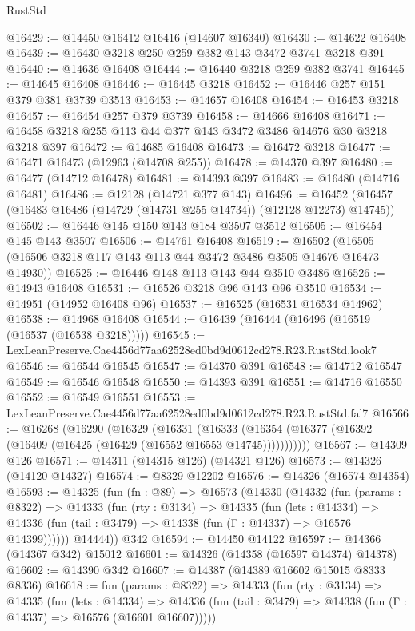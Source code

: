 \begin{lexlean}{RustStd}
\begin{coremodule}
@16429 := @14450 @16412 @16416 (@14607 @16340)
@16430 := @14622 @16408
@16439 := @16430 @3218 @250 @259 @382 @143 @3472 @3741 @3218 @391
@16440 := @14636 @16408
@16444 := @16440 @3218 @259 @382 @3741
@16445 := @14645 @16408
@16446 := @16445 @3218
@16452 := @16446 @257 @151 @379 @381 @3739 @3513
@16453 := @14657 @16408
@16454 := @16453 @3218
@16457 := @16454 @257 @379 @3739
@16458 := @14666 @16408
@16471 := @16458 @3218 @255 @113 @44 @377 @143 @3472 @3486 @14676 @30 @3218 @3218 @397
@16472 := @14685 @16408
@16473 := @16472 @3218
@16477 := @16471 @16473 (@12963 (@14708 @255))
@16478 := @14370 @397
@16480 := @16477 (@14712 @16478)
@16481 := @14393 @397
@16483 := @16480 (@14716 @16481)
@16486 := @12128 (@14721 @377 @143)
@16496 := @16452 (@16457 (@16483 @16486 (@14729 (@14731 @255 @14734)) (@12128 @12273) @14745))
@16502 := @16446 @145 @150 @143 @184 @3507 @3512
@16505 := @16454 @145 @143 @3507
@16506 := @14761 @16408
@16519 := @16502 (@16505 (@16506 @3218 @117 @143 @113 @44 @3472 @3486 @3505 @14676 @16473 @14930))
@16525 := @16446 @148 @113 @143 @44 @3510 @3486
@16526 := @14943 @16408
@16531 := @16526 @3218 @96 @143 @96 @3510
@16534 := @14951 (@14952 @16408 @96)
@16537 := @16525 (@16531 @16534 @14962)
@16538 := @14968 @16408
@16544 := @16439 (@16444 (@16496 (@16519 (@16537 (@16538 @3218)))))
@16545 := LexLeanPreserve.Cae4456d77aa62528ed0bd9d0612cd278.R23.RustStd.look7
@16546 := @16544 @16545
@16547 := @14370 @391
@16548 := @14712 @16547
@16549 := @16546 @16548
@16550 := @14393 @391
@16551 := @14716 @16550
@16552 := @16549 @16551
@16553 := LexLeanPreserve.Cae4456d77aa62528ed0bd9d0612cd278.R23.RustStd.fal7
@16566 := @16268
    (@16290
      (@16329
        (@16331
          (@16333 (@16354 (@16377 (@16392 (@16409 (@16425 (@16429 (@16552 @16553 @14745)))))))))))
@16567 := @14309 @126
@16571 := @14311 (@14315 @126) (@14321 @126)
@16573 := @14326 (@14120 @14327)
@16574 := @8329 @12202
@16576 := @14326 (@16574 @14354)
@16593 := @14325
    (fun (fn : @89) =>
    @16573
      (@14330
        (@14332
          (fun (params : @8322) =>
          @14333
            (fun (rty : @3134) =>
            @14335
              (fun (lets : @14334) =>
              @14336 (fun (tail : @3479) => @14338 (fun (Γ : @14337) => @16576 @14399))))))
        @14444))
    @342
@16594 := @14450 @14122
@16597 := @14366 (@14367 @342) @15012
@16601 := @14326 (@14358 (@16597 @14374) @14378)
@16602 := @14390 @342
@16607 := @14387 (@14389 @16602 @15015 @8333 @8336)
@16618 := fun (params : @8322) =>
  @14333
    (fun (rty : @3134) =>
    @14335
      (fun (lets : @14334) =>
      @14336 (fun (tail : @3479) => @14338 (fun (Γ : @14337) => @16576 (@16601 @16607)))))

\end{coremodule}
\end{lexlean}
